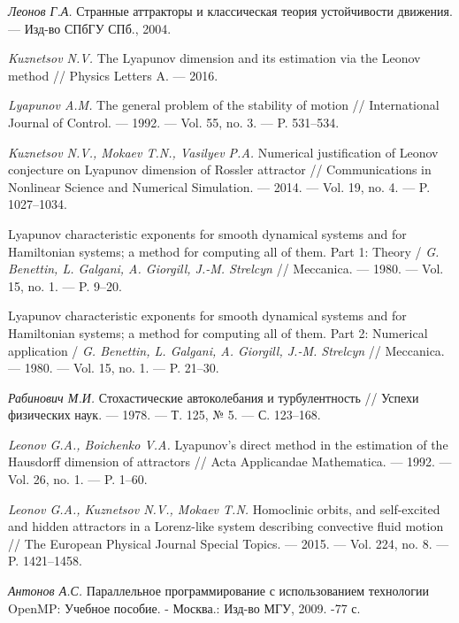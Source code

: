 \documentclass{spisok-article}
\begin{document}
\renewcommand\refname{Литература}
\begin{thebibliography}{8}

 {\it Леонов Г.\;А.} Странные аттракторы и классическая теория устойчивости движения. — Изд-во СПбГУ СПб., 2004.

 {\it Kuznetsov N.\;V.} The Lyapunov dimension and its estimation via the Leonov method // Physics Letters A. --- 2016.

 {\it Lyapunov A.\;M.} The general problem of the stability of motion // International Journal of Control. --- 1992. --- Vol. 55, no. 3. --- P. 531--534.

 {\it Kuznetsov N.\;V., Mokaev T.\;N., Vasilyev P.\;A.}  Numerical justification
of Leonov conjecture on Lyapunov dimension of Rossler attractor // Communications in Nonlinear Science and Numerical Simulation. --- 2014. --- Vol. 19, no. 4. --- P. 1027--1034.

 Lyapunov characteristic exponents for smooth dynamical systems and for Hamiltonian systems; a method for computing all of them. Part 1: Theory / {\it G. Benettin, L. Galgani, A. Giorgill, J.-M. Strelcyn} // Meccanica. --- 1980. --- Vol. 15, no. 1. --- P. 9--20.

 Lyapunov characteristic exponents for smooth dynamical systems and for Hamiltonian systems; a method for computing all of them. Part 2: Numerical application / {\it G. Benettin, L. Galgani, A. Giorgill, J.-M. Strelcyn} // Meccanica. --- 1980. --- Vol. 15, no. 1. --- P. 21--30.

 {\it Рабинович М.\;И.} Стохастические автоколебания и турбулентность // Успехи физических наук. — 1978. — Т. 125, № 5. — С. 123–168.

 {\it Leonov G.\;A., Boichenko V.\;A.} Lyapunov's direct method in the estimation of the Hausdorff dimension of attractors // Acta Applicandae Mathematica. --- 1992. --- Vol. 26, no. 1. --- P. 1--60.

 {\it Leonov G.\;A., Kuznetsov N.\;V., Mokaev T.\;N.} Homoclinic orbits, and self-excited and hidden attractors in a Lorenz-like system describing convective fluid motion // The European Physical Journal Special Topics. --- 2015. --- Vol. 224, no. 8. --- P. 1421--1458.

 {\it Антонов А.\;С.} Параллельное программирование с использованием технологии OpenMP: Учебное пособие. - Москва.: Изд-во МГУ, 2009. -77 с.

\end{thebibliography}
\end{document}
